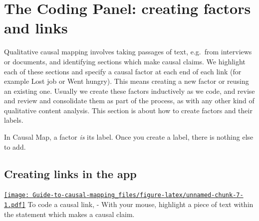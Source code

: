 \documentclass[
]{book}
\begin{document}
\hypertarget{xcoding-panel}{%
\chapter{The Coding Panel: creating factors and links}\label{xcoding-panel}}

Qualitative causal mapping involves taking passages of text, e.g.~from interviews or documents, and identifying sections which make causal claims. We highlight each of these sections and specify a causal factor at each end of each link (for example Lost job or Went hungry). This means creating a new factor or reusing an existing one. Usually we create these factors inductively as we code, and revise and review and consolidate them as part of the process, as with any other kind of qualitative content analysis. This section is about how to create factors and their labels.

In Causal Map, a factor \emph{is} its label. Once you create a label, there is nothing else to add.

\hypertarget{creating-links-in-the-app}{%
\section{Creating links in the app}\label{creating-links-in-the-app}}

\href{https://player.vimeo.com/video/604099226}{\texttt{[image: Guide-to-causal-mapping\_files/figure-latex/unnamed-chunk-7-1.pdf]}}
To code a causal link, - With your mouse, highlight a piece of text within the statement which makes a causal claim.
\end{document}
